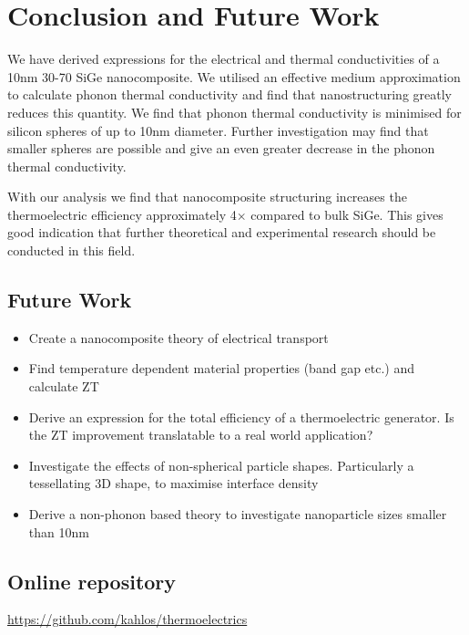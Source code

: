\documentclass[12pt]{article}
\begin{document}
\section{Conclusion and Future Work}
We have derived expressions for the electrical and thermal conductivities of a 10nm 30-70 SiGe nanocomposite. We utilised an effective medium approximation to calculate phonon thermal conductivity and find that nanostructuring greatly reduces this quantity. We find that phonon thermal conductivity is minimised for silicon spheres of up to 10nm diameter. Further investigation may find that smaller spheres are possible and give an even greater decrease in the phonon thermal conductivity.

With our analysis we find that nanocomposite structuring increases the thermoelectric efficiency approximately 4$\times$ compared to bulk SiGe. This gives good indication that further theoretical and experimental research should be conducted in this field.

\subsection{Future Work}
\begin{itemize}
  \item Create a nanocomposite theory of electrical transport
  \item Find temperature dependent material properties (band gap etc.) and calculate ZT
  \item Derive an expression for the total efficiency of a thermoelectric generator. Is the ZT improvement translatable to a real world application?
  \item Investigate the effects of non-spherical particle shapes. Particularly a tessellating 3D shape, to maximise interface density
  \item Derive a non-phonon based theory to investigate nanoparticle sizes smaller than 10nm
\end{itemize}

\subsection{Online repository}
\url{https://github.com/kahlos/thermoelectrics}

\pagebreak
\end{document}
